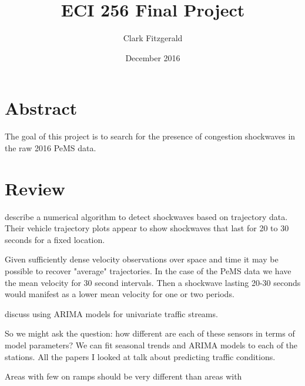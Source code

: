 \documentclass[12pt]{article}
\begin{document}
\title{ECI 256 Final Project}
\date{December 2016}
\author{Clark Fitzgerald}
\maketitle

\section{Abstract}

The goal of this project is to search for the presence of congestion
shockwaves in the raw 2016 PeMS data.

\section{Review}

\cite{lu2007freeway} describe a numerical algorithm to detect shockwaves
based on trajectory data. Their vehicle trajectory plots appear to show
shockwaves that last for 20 to 30 seconds for a fixed location.

Given sufficiently dense velocity observations over space and time it may
be possible to recover "average" trajectories. In the case of the PeMS data
we have the mean velocity for 30 second intervals. Then a shockwave lasting
20-30 seconds would manifest as a lower mean velocity for one or two
periods.

\cite{williams2003modeling} discuss using ARIMA models for univariate
traffic streams.


So we might ask the question: how different are each of these sensors in
terms of model parameters? We can fit seasonal trends and ARIMA
models to each of the stations. All the papers I looked at talk about
predicting traffic conditions.

Areas with few on ramps should be very different than areas with 

 


\end{document}
